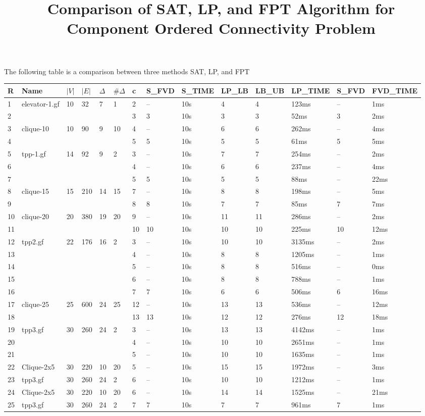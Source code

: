 \documentclass{article}
\title{Comparison of SAT, LP, and FPT Algorithm for Component Ordered Connectivity Problem}
\begin{document}
\maketitle
The following table is a comparison  between three methods SAT, LP, and FPT 
\begin{longtable}{|l |l |l |l |l |l |l |l |l |l |l |l |l |l |}
\hline
R&Name&$|V|$&$|E|$&$\Delta$&$\# \Delta$&c&S\_FVD&S\_TIME&LP\_LB&LB\_UB&LP\_TIME&S\_FVD&FVD\_TIME\\
\hline
1&elevator-1.gf&10&32&7&1&2&--&10s&4&4&123ms&--&1ms\\
2&&&&&&3&3&10s&3&3&52ms&3&2ms\\
3&clique-10&10&90&9&10&4&--&10s&6&6&262ms&--&4ms\\
4&&&&&&5&5&10s&5&5&61ms&5&5ms\\
5&tpp-1.gf&14&92&9&2&3&--&10s&7&7&254ms&--&2ms\\
6&&&&&&4&--&10s&6&6&237ms&--&4ms\\
7&&&&&&5&5&10s&5&5&88ms&--&22ms\\
8&clique-15&15&210&14&15&7&--&10s&8&8&198ms&--&5ms\\
9&&&&&&8&8&10s&7&7&85ms&7&7ms\\
10&clique-20&20&380&19&20&9&--&10s&11&11&286ms&--&2ms\\
11&&&&&&10&10&10s&10&10&225ms&10&12ms\\
12&tpp2.gf&22&176&16&2&3&--&10s&10&10&3135ms&--&2ms\\
13&&&&&&4&--&10s&8&8&1205ms&--&1ms\\
14&&&&&&5&--&10s&8&8&516ms&--&0ms\\
15&&&&&&6&--&10s&8&8&788ms&--&1ms\\
16&&&&&&7&7&10s&6&6&506ms&6&16ms\\
17&clique-25&25&600&24&25&12&--&10s&13&13&536ms&--&12ms\\
18&&&&&&13&13&10s&12&12&276ms&12&18ms\\
19&tpp3.gf&30&260&24&2&3&--&10s&13&13&4142ms&--&1ms\\
20&&&&&&4&--&10s&10&10&2651ms&--&1ms\\
21&&&&&&5&--&10s&10&10&1635ms&--&1ms\\
22&Clique-2x5&30&220&10&20&5&--&10s&15&15&1972ms&--&3ms\\
23&tpp3.gf&30&260&24&2&6&--&10s&10&10&1212ms&--&1ms\\
24&Clique-2x5&30&220&10&20&6&--&10s&14&14&1525ms&--&21ms\\
25&tpp3.gf&30&260&24&2&7&7&10s&7&7&961ms&7&1ms\\

\end{longtable}
\end{document}
